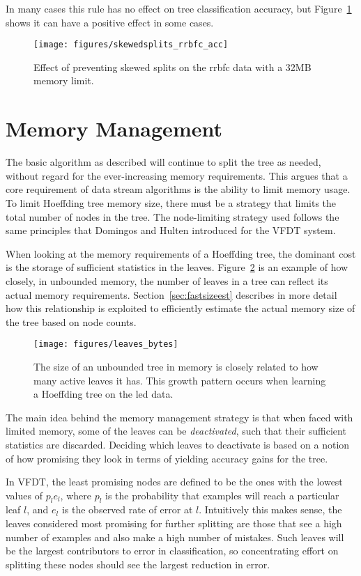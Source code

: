 In many cases this rule has no effect on tree classification accuracy, but Figure~\ref{fig:skewedsplits_rrbfc} shows it can have a positive effect in some cases.

\begin{figure}
\texttt{[image: figures/skewedsplits\_rrbfc\_acc]}
\caption{Effect of preventing skewed splits on the {\sc rrbfc} data with a 32MB memory limit.}
\label{fig:skewedsplits_rrbfc}
\end{figure}

\section{Memory Management}
\label{sec:memmanage}

The basic algorithm as described will continue to split the tree as needed, without regard for the ever-increasing memory requirements. This \thesis  argues that a core requirement of data stream algorithms is the ability to limit memory usage. To limit Hoeffding tree memory size, there must be a strategy that limits the total number of nodes in the tree.
The node-limiting strategy used follows the same principles that Domingos and Hulten introduced for the VFDT system.

When looking at the memory requirements of a Hoeffding tree, the dominant cost is the storage of sufficient statistics in the leaves. Figure~\ref{fig:leaves_bytes} is an example of how closely, in unbounded memory, the number of leaves in a tree can reflect its actual memory requirements. Section~\ref{sec:fastsizeest} describes in more detail how this relationship is exploited to efficiently estimate the actual memory size of the tree based on node counts.

\begin{figure}
\texttt{[image: figures/leaves\_bytes]}
\caption{The size of an unbounded tree in memory is closely related to how many active leaves it has. This growth pattern occurs when learning a Hoeffding tree on the {\sc led} data.}
\label{fig:leaves_bytes}
\end{figure}

The main idea behind the memory management strategy is that when faced with limited memory, some of the leaves can be {\em deactivated}, such that their sufficient statistics are discarded. Deciding which leaves to deactivate is based on a notion of how promising they look in terms of yielding accuracy gains for the tree.

In VFDT, the least promising nodes are defined to be the ones with the lowest values of $p_{l}e_{l}$, where $p_{l}$ is the probability that examples will reach a particular leaf $l$, and $e_{l}$ is the observed rate of error at $l$. Intuitively this makes sense, the leaves considered most promising for further splitting are those that see a high number of examples and also make a high number of mistakes. Such leaves will be the largest contributors to error in classification, so concentrating effort on splitting these nodes should see the largest reduction in error.

